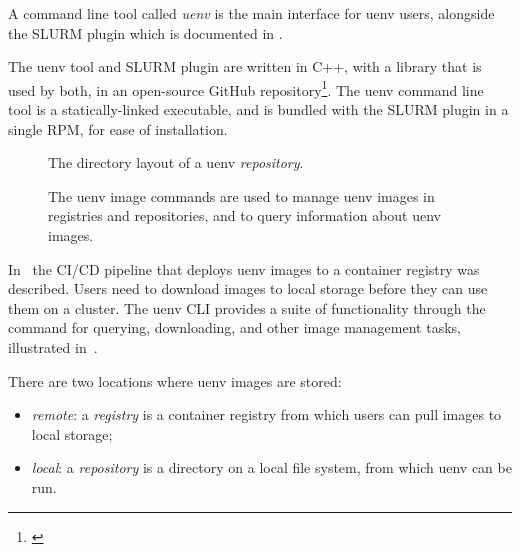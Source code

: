 A command line tool called \emph{uenv} is the main interface for uenv users, alongside the SLURM plugin which is documented in .

The uenv tool and SLURM plugin are written in C++, with a library that is used by both, in an open-source GitHub repository\footnote{\href{https://github.com/eth-cscs/uenv2}{}}.
The uenv command line tool is a statically-linked executable, and is bundled with the SLURM plugin in a single RPM, for ease of installation.


\begin{figure}[htp!]
    
    \caption{The directory layout of a uenv \emph{repository}.}
    \label{fig:repo-path}
\end{figure}

\begin{figure*}[htp!]
    \begin{center}
        
    \end{center}
    \caption{The uenv image commands are used to manage uenv images in registries and repositories, and to query information about uenv images.}
    \label{fig:uenv-manage}
\end{figure*}

In~ the CI/CD pipeline that deploys uenv images to a container registry was described.
Users need to download images to local storage before they can use them on a cluster.
The uenv CLI provides a suite of functionality through the  command for querying, downloading, and other image management tasks, illustrated in~.

There are two locations where uenv images are stored:
\begin{itemize}
    \item \emph{remote}: a \emph{registry} is a container registry from which users can pull images to local storage;
    \item \emph{local}: a \emph{repository} is a directory on a local file system, from which uenv can be run.
\end{itemize}

